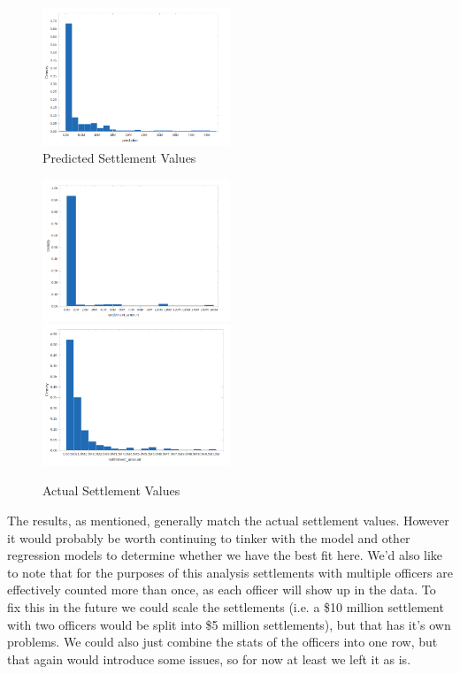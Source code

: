 \documentclass[11pt]{article}
\begin{document}
\begin{figure}[h]
\centering
\caption{Predicted Settlement Values}
\includegraphics[width=0.5\textwidth]{predicted.png}
\end{figure}

\begin{figure}[h]
\caption{Actual Settlement Values}
\includegraphics[width=0.5\textwidth]{actual.png}
\includegraphics[width=0.5\textwidth]{actual2.png}
\end{figure}

The results, as mentioned, generally match the actual settlement values. However it would probably be worth continuing to tinker with the model and other regression models to determine whether we have the best fit here. We'd also like to note that for the purposes of this analysis settlements with multiple officers are effectively counted more than once, as each officer will show up in the data. To fix this in the future we could scale the settlements (i.e. a \$10 million settlement with two officers would be split into \$5 million settlements), but that has it's own problems. We could also just combine the stats of the officers into one row, but that again would introduce some issues, so for now at least we left it as is.
\end{document}
